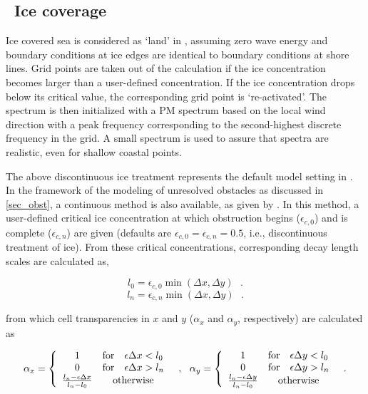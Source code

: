 \subsection{~Ice coverage} \label{sub:ice}
\vssub

\noindent
Ice covered sea is considered as `land' in \ws, assuming zero wave energy and
boundary conditions at ice edges are identical to boundary conditions at shore
lines. Grid points are taken out of the calculation if the ice concentration
becomes larger than a user-defined concentration. If the ice concentration
drops below its critical value, the corresponding grid point is
`re-activated'. The spectrum is then initialized with a PM spectrum based on
the local wind direction with a peak frequency corresponding to the
second-highest discrete frequency in the grid. A small spectrum is used to
assure that spectra are realistic, even for shallow coastal points.

The above discontinuous ice treatment represents the default model setting in
\ws. In the framework of the modeling of unresolved obstacles as discussed in
\para\ref{sec_obst}, a continuous method is also available, as given by
\cite{tol:OMOD03a}. In this method, a user-defined critical ice concentration
at which obstruction begins ($\epsilon_{c,0}$) and is complete
($\epsilon_{c,n}$) are given (defaults are $\epsilon_{c,0} = \epsilon_{c,n} =
0.5$, i.e., discontinuous treatment of ice). From these critical
concentrations, corresponding decay length scales are calculated as,

\begin{equation}
l_0 = \epsilon_{c,0} \min ( \Delta x , \Delta y )
\:\:\: . \label{eq:l0}
\end{equation}
\begin{equation}
l_n = \epsilon_{c,n} \min ( \Delta x , \Delta y )
\:\:\: . \label{eq:ln}
\end{equation}

\noindent
from which cell transparencies in $x$ and $y$ ($\alpha_x$ and $\alpha_y$,
respectively) are calculated as

\begin{equation}
\alpha_x = \left \{ \begin{array}{ccl}
 1 & \mbox{for} & \epsilon \Delta x < l_0 \\
 0 & \mbox{for} & \epsilon \Delta x > l_n \\
\frac{l_n - \epsilon \Delta x}{l_n - l_0} & \multicolumn{2}{c}{\mbox{otherwise}} 
\end{array} \right .
\:\:\: , \:\:\:
\alpha_y = \left \{ \begin{array}{ccl}
 1 & \mbox{for} & \epsilon \Delta y < l_0 \\
 0 & \mbox{for} & \epsilon \Delta y > l_n \\
\frac{l_n - \epsilon \Delta y}{l_n - l_0} & \multicolumn{2}{c}{\mbox{otherwise}} 
\end{array} \right .
\:\:\: . \label{eq:ice_0} 
\end{equation}

